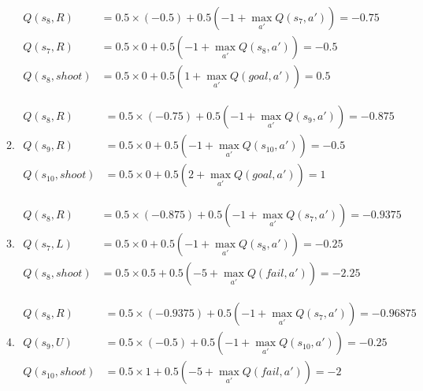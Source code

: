 \begin{enumerate}
\begin{enumerate}
\begin{align*}
            Q(s_8, R) &= 0.5 \times (-0.5) + 0.5 (-1 + \max_{a'} Q(s_7, a')) = -0.75\\
            Q(s_7, R) &= 0.5 \times 0 + 0.5 (-1 + \max_{a'} Q(s_8, a')) = -0.5\\
            Q(s_8, shoot) &= 0.5 \times 0 + 0.5 (1 + \max_{a'} Q(goal, a')) = 0.5
        \end{align*}
        \item \begin{align*}
            Q(s_8, R) &= 0.5 \times (-0.75) + 0.5 (-1 + \max_{a'} Q(s_9, a')) = −0.875\\
            Q(s_9, R) &= 0.5 \times 0 + 0.5 (-1 + \max_{a'} Q(s_{10}, a')) = -0.5\\
            Q(s_{10}, shoot) &= 0.5 \times 0 + 0.5 (2 + \max_{a'} Q(goal, a')) = 1
        \end{align*}
        \item \begin{align*}
            Q(s_8, R) &= 0.5 \times (−0.875) + 0.5 (-1 + \max_{a'} Q(s_7, a')) = −0.9375\\
            Q(s_7, L) &= 0.5 \times 0 + 0.5 (-1 + \max_{a'} Q(s_8, a')) = -0.25\\
            Q(s_8, shoot) &= 0.5 \times 0.5 + 0.5 (-5 + \max_{a'} Q(fail, a')) = -2.25
        \end{align*}
        \item \begin{align*}
            Q(s_8, R) &= 0.5 \times (−0.9375) + 0.5 (-1 + \max_{a'} Q(s_7, a')) = −0.96875\\
            Q(s_9, U) &= 0.5 \times (-0.5) + 0.5 (-1 + \max_{a'} Q(s_{10}, a')) = −0.25\\
            Q(s_{10}, shoot) &= 0.5 \times 1 + 0.5 (-5 + \max_{a'} Q(fail, a')) = -2
        \end{align*}
    \end{enumerate}
\end{enumerate}








